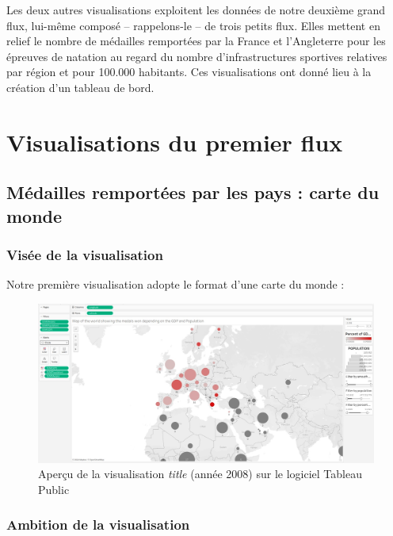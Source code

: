 \documentclass[hidelinks, 12pt]{report}
\begin{document}
Les deux autres visualisations exploitent les données de notre deuxième grand flux, lui-même composé -- rappelons-le -- de trois petits flux. Elles mettent en relief le nombre de médailles remportées par la France et l'Angleterre pour les épreuves de natation au regard du nombre d'infrastructures sportives relatives par région et pour 100.000 habitants. Ces visualisations ont donné lieu à la création d'un tableau de bord. 


\section{Visualisations du premier flux}

\subsection{Médailles remportées par les pays : carte du monde}

\subsubsection{Visée de la visualisation}

\label{map}Notre première visualisation adopte le format d'une carte du monde :

\begin{center}
	\begin{figure}[H]
		\centering
		\setlength{\belowcaptionskip}{-35pt}
		\includegraphics[scale=0.25]{images/datavis-medals-world-map.jpeg}
		\caption{Aperçu de la visualisation \textit{title} (année 2008) sur le logiciel Tableau Public}
	\end{figure}
\end{center}

\subsubsection{Ambition de la visualisation}
\end{document}
